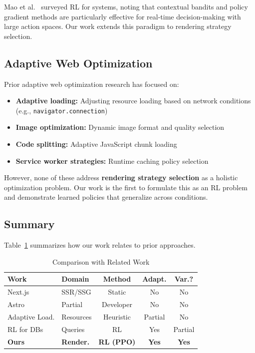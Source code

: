 \documentclass[10pt,twocolumn]{article}
\begin{document}
Mao et al.~\cite{mao2021reinforcement} surveyed RL for systems, noting that contextual bandits and policy gradient methods are particularly effective for real-time decision-making with large action spaces. Our work extends this paradigm to rendering strategy selection.

\subsection{Adaptive Web Optimization}

Prior adaptive web optimization research has focused on:

\begin{itemize}[nosep]
\item \textbf{Adaptive loading:} Adjusting resource loading based on network conditions (e.g., \texttt{navigator.connection})~\cite{osmani2019adaptive}
\item \textbf{Image optimization:} Dynamic image format and quality selection~\cite{chen2025mrah}
\item \textbf{Code splitting:} Adaptive JavaScript chunk loading
\item \textbf{Service worker strategies:} Runtime caching policy selection~\cite{mozilla2024serviceworker}
\end{itemize}

However, none of these address \textbf{rendering strategy selection} as a holistic optimization problem. Our work is the first to formulate this as an RL problem and demonstrate learned policies that generalize across conditions.

\subsection{Summary}

Table~\ref{tab:related} summarizes how our work relates to prior approaches.

\begin{table}[t]
\centering
\caption{Comparison with Related Work}
\label{tab:related}
\small
\begin{tabular}{llccc}
\toprule
\textbf{Work} & \textbf{Domain} & \textbf{Method} & \textbf{Adapt.} & \textbf{Var.?} \\
\midrule
Next.js & SSR/SSG & Static & No & No \\
Astro & Partial & Developer & No & No \\
Adaptive Load. & Resources & Heuristic & Partial & No \\
RL for DBs & Queries & RL & Yes & Partial \\
\textbf{Ours} & \textbf{Render.} & \textbf{RL (PPO)} & \textbf{Yes} & \textbf{Yes} \\
\bottomrule
\end{tabular}
\end{table}
\end{document}
